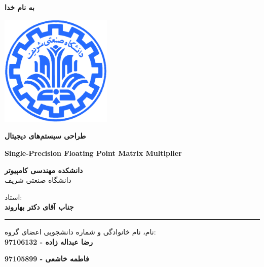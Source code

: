 \documentclass[12pt,titlepage,a4page , tikz , multi,table , svgnames,xcdraw]{article}
\begin{document}
\begin{titlepage}

 \begin{center}
        
       \vspace*{0.5cm}

 \vspace{0.5cm}
       \textbf{ \Huge{به نام خدا} }
       \vspace{0.2cm}
       
       \includegraphics[width=0.4\textwidth]{sharif1.png}
       
 	\vspace{0.3cm}
       \textbf{ \LARGE{طراحی سیستم‌های دیجیتال} }

 
   \vspace{0.3cm}
  \textbf{ \Large{ Single-Precision Floating Point Matrix Multiplier} }
   \vspace{0.3cm}
       
 
      \large \textbf{دانشکده مهندسی کامپیوتر}\\\vspace{0.2cm}
    \large   دانشگاه صنعتی شریف\\\vspace{0.25cm}
      
استاد:\\
    \textbf{{جناب آقای دکتر بهاروند}}

    \vspace{0.15cm}
    \noindent\rule[1ex]{\linewidth}{3pt}
    
    \vspace{0.5cm}
نام، نام خانوادگی و شماره دانشجویی اعضای گروه:\\

    
    \textbf{{رضا عبداله زاده - 97106132}}
        \vspace{0.05cm}
        
     
        \textbf{{فاطمه خاشعی - 97105899 }}
        \vspace{0.05cm}
        

\end{center}
\end{titlepage}
\end{document}
